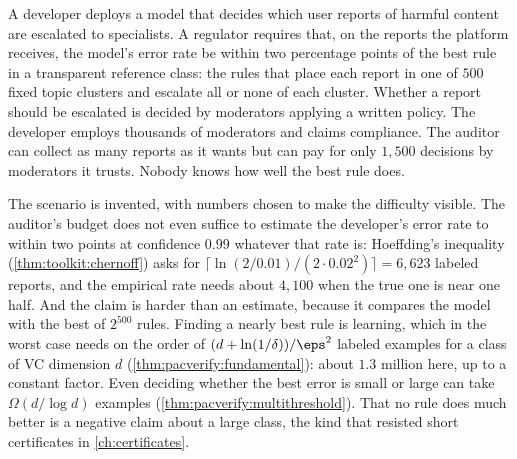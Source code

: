 \begin{refsection}
\begin{oversight}
A developer deploys a model that decides which user reports of harmful content are escalated to specialists. A regulator requires that, on the reports the platform receives, the model's error rate be within two percentage points of the best rule in a transparent reference class: the rules that place each report in one of $500$ fixed topic clusters and escalate all or none of each cluster. Whether a report should be escalated is decided by moderators applying a written policy. The developer employs thousands of moderators and claims compliance. The auditor can collect as many reports as it wants but can pay for only $1{,}500$ decisions by moderators it trusts. Nobody knows how well the best rule does.
\end{oversight}

The scenario is invented, with numbers chosen to make the difficulty visible. The auditor's budget does not even suffice to estimate the developer's error rate to within two points at confidence $0.99$ whatever that rate is: Hoeffding's inequality (\cref{thm:toolkit:chernoff}) asks for $\lceil\ln(2/0.01)/(2\cdot0.02^2)\rceil=6{,}623$ labeled reports, and the empirical rate needs about $4{,}100$ when the true one is near one half. And the claim is harder than an estimate, because it compares the model with the best of $2^{500}$ rules. Finding a nearly best rule is learning, which in the worst case needs on the order of $(d+\ln(1/\delta))/\eps^2$ labeled examples for a class of VC dimension $d$ (\cref{thm:pacverify:fundamental}): about $1.3$ million here, up to a constant factor. Even deciding whether the best error is small or large can take $\Omega(d/\log d)$ examples (\cref{thm:pacverify:multithreshold}). That no rule does much better is a negative claim about a large class, the kind that resisted short certificates in \cref{ch:certificates}.


\end{refsection}
